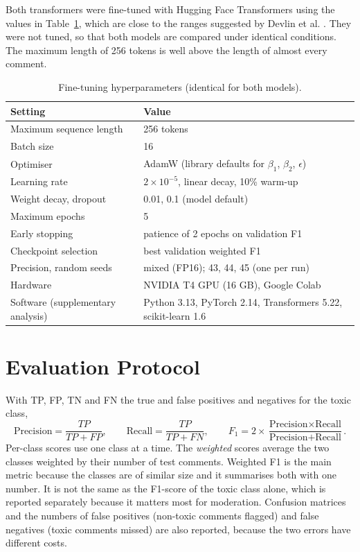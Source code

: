 Both transformers were fine-tuned with Hugging Face Transformers \cite{wolf2020transformers} using the values in Table~\ref{tab:hyper}, which are close to the ranges suggested by Devlin et al. \cite{devlin2019bert}. They were not tuned, so that both models are compared under identical conditions. The maximum length of 256 tokens is well above the length of almost every comment.

\begin{table}[H]
  \centering
  \caption{Fine-tuning hyperparameters (identical for both models).}
  \label{tab:hyper}
  \small
  \begin{tabular}{ll}
    \toprule
    \textbf{Setting} & \textbf{Value} \\
    \midrule
    Maximum sequence length & 256 tokens \\
    Batch size & 16 \\
    Optimiser & AdamW (library defaults for $\beta_1$, $\beta_2$, $\epsilon$) \\
    Learning rate & $2\times10^{-5}$, linear decay, 10\% warm-up \\
    Weight decay, dropout & 0.01, 0.1 (model default) \\
    Maximum epochs & 5 \\
    Early stopping & patience of 2 epochs on validation F1 \\
    Checkpoint selection & best validation weighted F1 \\
    Precision, random seeds & mixed (FP16); 43, 44, 45 (one per run) \\
    Hardware & NVIDIA T4 GPU (16 GB), Google Colab \\
    Software (supplementary analysis) & Python 3.13, PyTorch 2.14, Transformers 5.22, scikit-learn 1.6 \\
    \bottomrule
  \end{tabular}
\end{table}

\section{Evaluation Protocol}

With TP, FP, TN and FN the true and false positives and negatives for the toxic class,
\begin{equation}
  \text{Precision} = \frac{TP}{TP+FP}, \qquad
  \text{Recall} = \frac{TP}{TP+FN}, \qquad
  F_1 = 2\times\frac{\text{Precision}\times\text{Recall}}{\text{Precision}+\text{Recall}}.
\end{equation}
Per-class scores use one class at a time. The \emph{weighted} scores average the two classes weighted by their number of test comments. Weighted F1 is the main metric because the classes are of similar size and it summarises both with one number. It is not the same as the F1-score of the toxic class alone, which is reported separately because it matters most for moderation. Confusion matrices and the numbers of false positives (non-toxic comments flagged) and false negatives (toxic comments missed) are also reported, because the two errors have different costs.

